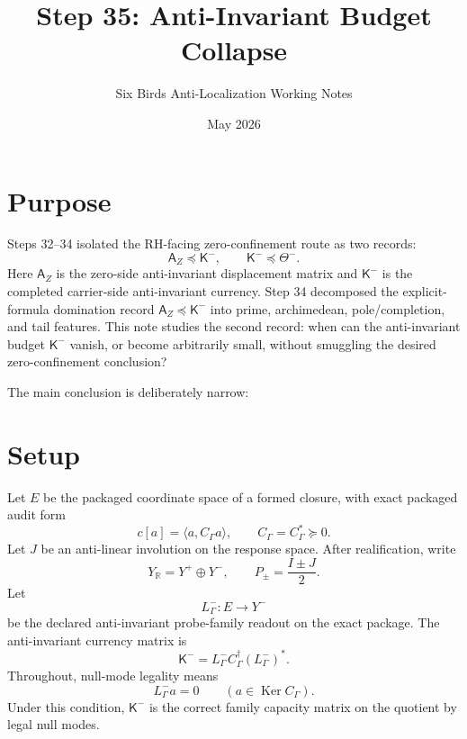 \documentclass[11pt]{article}
\title{Step 35: Anti-Invariant Budget Collapse}
\author{Six Birds Anti-Localization Working Notes}
\date{May 2026}
\newcommand{\K}{\mathsf K}
\newcommand{\A}{\mathsf A}
\newcommand{\ThetaB}{\Theta^-}
\newcommand{\Ker}{\operatorname{Ker}}
\newcommand{\pre}{\preceq}
\newcommand{\suc}{\succeq}
\begin{document}
\maketitle

\section{Purpose}

Steps 32--34 isolated the RH-facing zero-confinement route as two records:
\begin{equation}
\A_Z \pre \K^- ,
\qquad
\K^- \pre \ThetaB .
\end{equation}
Here \(\A_Z\) is the zero-side anti-invariant displacement matrix and \(\K^-\) is the completed carrier-side anti-invariant currency. Step 34 decomposed the explicit-formula domination record \(\A_Z\pre\K^-\) into prime, archimedean, pole/completion, and tail features. This note studies the second record: when can the anti-invariant budget \(\K^-\) vanish, or become arbitrarily small, without smuggling the desired zero-confinement conclusion?

The main conclusion is deliberately narrow:
\begin{center}
\end{center}

\section{Setup}

Let \(E\) be the packaged coordinate space of a formed closure, with exact packaged audit form
\begin{equation}
  c[a] = \langle a,C_\Gamma a\rangle, \qquad C_\Gamma=C_\Gamma^*\suc 0.
\end{equation}
Let \(J\) be an anti-linear involution on the response space. After realification, write
\begin{equation}
Y_{\mathbb R}=Y^+\oplus Y^-,
\qquad
P_\pm = \frac{I\pm J}{2}.
\end{equation}
Let
\begin{equation}
  L^-_\Gamma:E\to Y^-
\end{equation}
be the declared anti-invariant probe-family readout on the exact package. The anti-invariant currency matrix is
\begin{equation}
\boxed{
  \K^- = L^-_\Gamma C_\Gamma^\dagger (L^-_\Gamma)^* .
}
\end{equation}
Throughout, null-mode legality means
\begin{equation}
  L^-_\Gamma a=0 \qquad (a\in\Ker C_\Gamma).
\end{equation}
Under this condition, \(\K^-\) is the correct family capacity matrix on the quotient by legal null modes.
\end{document}
